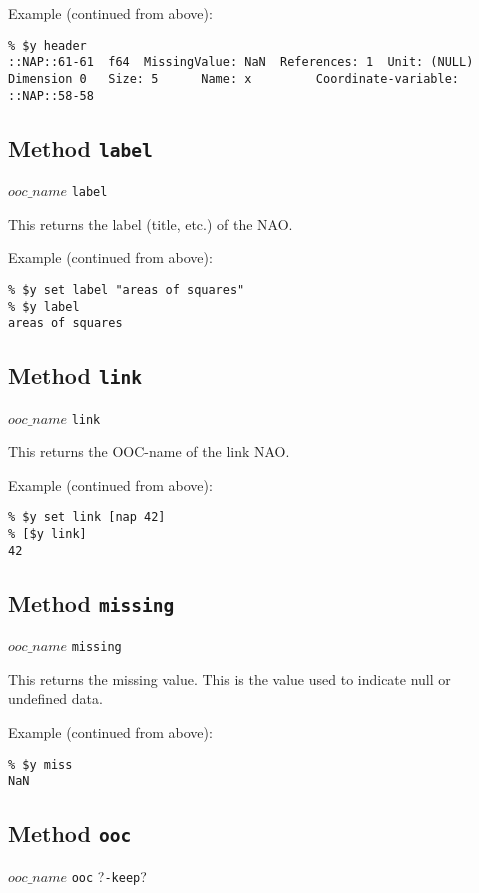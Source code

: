 Example (continued from above):
  \begin{verbatim}
% $y header
::NAP::61-61  f64  MissingValue: NaN  References: 1  Unit: (NULL)
Dimension 0   Size: 5      Name: x         Coordinate-variable: ::NAP::58-58
\end{verbatim}

\subsection{Method \texttt{label}}
    \label{ooc-meta-label}

$ooc\_name$ \texttt{label}

This returns the label (title, etc.) of the NAO.
  
Example (continued from above):
  \begin{verbatim}
% $y set label "areas of squares"
% $y label
areas of squares
\end{verbatim}

\subsection{Method \texttt{link}}
    \label{ooc-meta-link}

  $ooc\_name$ 
  \texttt{link}

This returns the OOC-name of the link NAO.
  
Example (continued from above):
  \begin{verbatim}
% $y set link [nap 42]
% [$y link]
42
\end{verbatim}

\subsection{Method \texttt{missing}}
    \label{ooc-meta-missing}

  $ooc\_name$ 
  \texttt{missing}

This returns the missing value. This is the value used to indicate
  null or undefined data.
  
Example (continued from above):
  \begin{verbatim}
% $y miss
NaN
\end{verbatim}

\subsection{Method \texttt{ooc}}
    \label{ooc-meta-ooc}

$ooc\_name$ \texttt{ooc} ?\texttt{-keep}?

